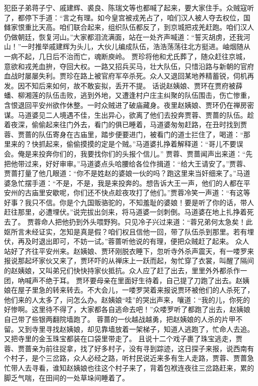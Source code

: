 \documentclass[12pt,oneside]{book}
\begin{document}
犯臣子弟蒋子宁、戚建辉、裘良、陈瑞文等也都喊了起来，要大家住手。众贼寇听了，都停下手道：“言之有理。如今皇宫被戎羌占了，咱们汉人被人夺去权位，国雠家恨重比天高。咱们联合起来，组织队伍都反了，到京城把戎羌赶跑。咱们汉人仍做朝廷，恢复河山。”大家都泪流满面，站在一处齐声喊道：“誓灭胡虏，还我河山！”一时推举戚建辉为头儿，大伙儿编成队伍，浩浩荡荡往北方挺进。岫烟随从一病不起，几日后不治而亡，魂断庾岭。
贾珍将他和尤氏葬了，随众赶往京城，意欲和戎羌血拚，夺回大权。一路又招兵买马，壮大队伍，只惜沿路与新朝的官府血战时屡屡失利。贾珍在路上被官府军卒杀死。众人又退回某地养精蓄锐，伺机再发。因不知后来如何，故不敢妄拟，丢开不提。
话说赵姨娘、贾环在贾府被薛蟠、柳湘莲的队伍击败，逃到外地，又遭逢村户庄主纠聚的队伍围击，伤亡惨重，含恨退回平安州欲作休整。一时众贼进了破庙藏身。夜里赵姨娘、贾环仍在禅房密谋。马道婆见二人境遇不佳，生出异心，欲离了他们去投奔贾蓉、贾蔷的队伍。趁着夜深，偷偷起来往门外去，看门的俱已睡着，马道婆匆匆赶路，在丑时找到贾蓉、贾蔷的队伍寄身在古庙里，踏步便要进门，被看门的道士拦住了，喝道：“那里来的？快抓起来，偷偷摸摸的定是个贼。”马道婆扎挣着解释道：“哥儿不要误会。俺是来投奔你们的，我要找你们的头报个信儿。”
贾蓉、贾蔷闻声出来道：“先把他带过来，好好审审。”马道婆点头哈腰给各位作揖道：“给大王请安了。”贾蓉、贾蔷打量了他几眼道：“你不是姓赵的婆娘一伙的吗？跑这里来当奸细来了。”马道婆急忙摆手道：“不是，不是，我是来投奔的。想告诉大王一声，他们的人都在平安州的古庙里安歇呢，你们还不快点趁夜攻打了他们。”贾蓉冷笑一声道：“有这等好事？我只不信。你是个九国贩骆驼的，不知羞耻的婆娘！要是听了你的话，带人赶往那里，必遭埋伏。”说完拔出剑来，将马道婆一剑刺倒。马道婆在地上扎挣着死去了。
贾蓉命人把他扔到外头喂野狗。只见冷子兴过来道：“蓉兄弟何太急矣！此妪所言未经证实，怎知是真是假？咱们权且信他一回，带了队伍杀到那里。若有埋伏，再及时退出即可，不妨一试。”蓉蔷听他说的有理，便把众贼赶了起来。
众人站好了齐往平安州来。赵姨娘、贾环刚脱衣睡下，忽听寺外杀声震天，有一喽罗来报说那起坏家伙又来了，贾环吓的从禅床上一跃而起，匆忙穿了衣裳，叫醒了隔间的赵姨娘，又叫弟兄们快快持家伙抵抗。众人应了赶了出去，里里外外都杀作一团，吶喊声不绝于耳。
贾环要母亲在里面好生待着，自己提了刀跑了出去。赵姨娘在屋子里急的转来转去。不大会儿，一喽罗哭着来报说贾环被他们的人杀死了，他们来的人太多了，问怎么办。赵姨娘“哇”的哭出声来，嚷道：“我的儿，你死的好惨啊。这里待不得了，大家都各自逃命去吧！”众喽罗听了都跑了出去，赵姨娘自己带了些银两翻院墙跑了。
蓉蔷的一伙越战越勇，把赵姨娘的人杀的片甲不留。又到寺里寻找赵姨娘，却见靠墙放着一架梯子，知道人逃跑了，忙命人去追。又把寺里的金玉珠宝都装在口袋里带走了。
且说十二个戏子裹了珠宝逃走，贾蓉、贾蔷亲为前往捉拿，找了好多村子，没有寻到踪迹，这日探子来报，说西南有个村子，是个三岔路，众人必经之路，听村民说近来多有生人走路，贾蓉、贾蔷急忙带人去寻看，谁知赵姨娘也往这个村子来了，背着包袱连夜往三岔路赶来，累的脚乏气喘，在田间的一处草垛间睡着了。
\end{document}
